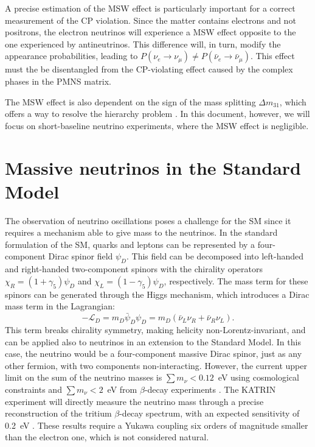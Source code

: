 A precise estimation of the MSW effect is particularly important for a correct measurement of the CP violation. Since the matter contains electrons and not positrons, the electron neutrinos will experience a MSW effect opposite to the one experienced by antineutrinos. This difference will, in turn, modify the appearance probabilities, leading to $P(\nu_{e}\rightarrow\nu_{\mu}) \neq P(\bar{\nu}_{e}\rightarrow\bar{\nu}_{\mu})$. This effect must the be disentangled from the CP-violating effect caused by the complex phases in the PMNS matrix.

The MSW effect is also dependent on the sign of the mass splitting $\Delta m_{31}$, which offers a way to resolve the hierarchy problem \cite{Smirnov:2013cqa}. 
In this document, however, we will focus on short-baseline neutrino experiments, where the MSW effect is negligible.

\section{Massive neutrinos in the Standard Model}
The observation of neutrino oscillations poses a challenge for the SM since it requires a mechanism able to give mass to the neutrinos.
In the standard formulation of the SM, quarks and leptons can be represented by a four-component Dirac spinor field $\psi_{D}$. This field can be decomposed into left-handed and right-handed two-component spinors with the chirality operators $\chi_{R} = (1+\gamma_5)\psi_D$ and $\chi_{L} = (1-\gamma_5)\psi_D$, respectively. The mass term for these spinors can be generated through the Higgs mechanism, which introduces a Dirac mass term in the Lagrangian:
\begin{equation}
    -\mathcal{L}_D = m_D\bar{\psi}_D\psi_D = m_D(\bar{\nu}_L\nu_R + \bar{\nu}_R\nu_L).
\end{equation}
This term breaks chirality symmetry, making helicity non-Lorentz-invariant, and can be applied also to neutrinos in an extension to the Standard Model. In this case, the neutrino would be a four-component massive Dirac spinor, just as any other fermion, with two components non-interacting.
However, the current upper limit on the sum of the neutrino masses is $\sum m_{\nu} < 0.12$~eV using cosmological constraints \cite{Aghanim:2018eyx} and $\sum m_{\nu} < 2$~eV from $\beta$-decay experiments \cite{Otten:2008zz}. The KATRIN experiment will directly measure the neutrino mass through a precise reconstruction of the tritium $\beta$-decay spectrum, with an expected sensitivity of 0.2~eV \cite{Osipowicz:2001sq}. These results require a Yukawa coupling six orders of magnitude smaller than the electron one, which is not considered natural. 

